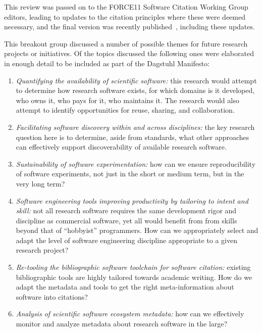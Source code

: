 \documentclass[a4paper,UKenglish]{dagrep}
\begin{document}
This review was passed on to the FORCE11 Software Citation Working Group editors, leading to updates to the citation principles where these were deemed necessary, and the final version was recently published~\cite{10.7717/peerj-cs.86}, including these updates.



This breakout group discussed a number of possible themes for future research projects or initiatives.
Of the topics discussed the following ones were elaborated in enough detail to be included as part of the Dagstuhl Manifesto:

\begin{enumerate}
\item \emph{Quantifying the availability of scientific software:} this research would attempt to determine how research software exists, for which domains is it developed, who owns it, who pays for it, who maintains it. The research would also attempt to identify opportunities for reuse, sharing, and collaboration.

\item \emph{Facilitating software discovery within and across disciplines:} the key research question here is to determine, aside from standards, what other approaches can effectively support discoverability of available research software.

\item \emph{Sustainability of software experimentation:} how can we ensure reproducibility of software experiments, not just in the short or medium term, but in the very long term?

\item \emph{Software engineering tools improving productivity by tailoring to intent and skill:} not all research software requires the same development rigor and discipline as commercial software, yet all would benefit from from skills beyond that of ``hobbyist'' programmers. How can we appropriately select and adapt the level of software engineering discipline appropriate to a given research project?

\item \emph{Re-tooling the bibliographic software toolchain for software citation:} existing bibliographic tools are highly tailored towards academic writing. How do we adapt the metadata and tools to get the right meta-information about software into citations?

\item \emph{Analysis of scientific software ecosystem metadata:} how can we effectively monitor and analyze metadata about research software in the large?

\end{enumerate}
\end{document}
